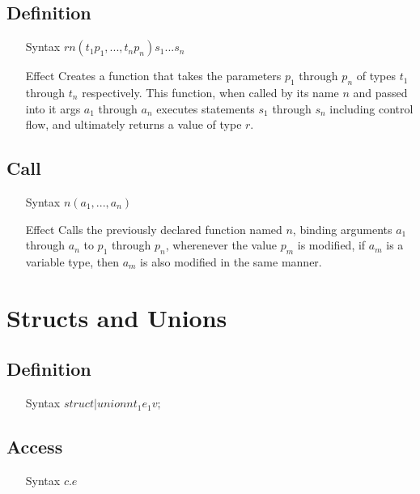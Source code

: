 \subsection{Definition}
\begin{itemize}
\item[Syntax] $r n(t_1 p_1, ..., t_n p_n) { s_1 ... s_n }$
\item[Effect] Creates a function that takes the parameters $p_1$ through $p_n$ of types $t_1$ through $t_n$ respectively. This function, when called by its name $n$ and passed into it args $a_1$ through $a_n$ executes statements $s_1$ through $s_n$ including control flow, and ultimately returns a value of type $r$.
\end{itemize}
\subsection{Call}
\begin{itemize}
\item[Syntax] $n(a_1, ..., a_n)$
\item[Effect] Calls the previously declared function named $n$, binding arguments $a_1$ through $a_n$ to $p_1$ through $p_n$, wherenever the value $p_m$ is modified, if $a_m$ is a variable type, then $a_m$ is also modified in the same manner.
\end{itemize}
\section{Structs and Unions}
\subsection{Definition}
\begin{itemize}
\item[Syntax] $struct|union n { t_1 e_1} v;$
\end{itemize}
\subsection{Access}
\begin{itemize}
\item[Syntax] $c.e$
\end{itemize}
